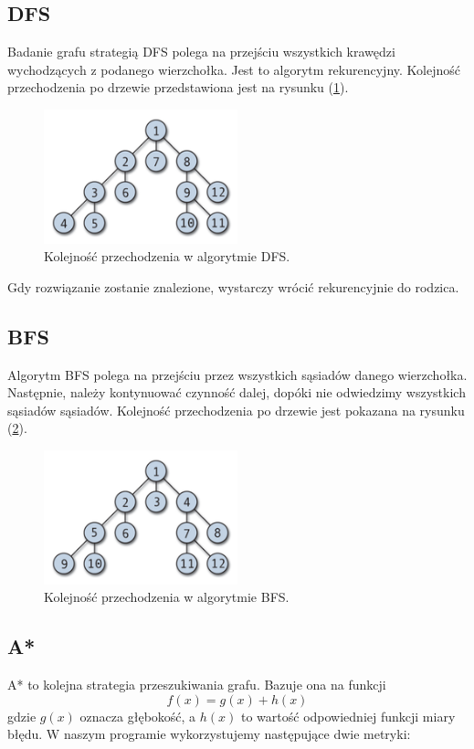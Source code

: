 \documentclass{classrep}
\begin{document}
\subsection{DFS} %
Badanie grafu strategią DFS polega na przejściu wszystkich krawędzi wychodzących z podanego wierzchołka. Jest to algorytm rekurencyjny. Kolejność przechodzenia po drzewie przedstawiona jest na rysunku (\ref{kolejnoscDFS}).
 \begin{figure}[h!]
    \centering
    \includegraphics[width=0.5\textwidth]{dfs.png}
    \caption{Kolejność przechodzenia w algorytmie DFS. \cite{wikiDFS}}
    \label{kolejnoscDFS}
\end{figure}
Gdy rozwiązanie zostanie znalezione, wystarczy wrócić rekurencyjnie do rodzica.

\subsection{BFS} %
Algorytm BFS polega na przejściu przez wszystkich sąsiadów danego wierzchołka. Następnie, należy kontynuować czynność dalej, dopóki nie odwiedzimy wszystkich sąsiadów sąsiadów. Kolejność przechodzenia po drzewie jest pokazana na rysunku (\ref{kolejnoscBFS}).
\begin{figure}[h!]
    \centering
    \includegraphics[width=0.5\textwidth]{bfs.png}
    \caption{Kolejność przechodzenia w algorytmie BFS. \cite{wikiBFS}}
    \label{kolejnoscBFS}
\end{figure}

\subsection{A*} %
A* to kolejna strategia przeszukiwania grafu. Bazuje ona na funkcji 
\begin{equation}
	f(x) = g(x) + h(x) 
	\label{fun}
\end{equation}
gdzie $g(x)$ oznacza głębokość, a $h(x)$ to wartość odpowiedniej funkcji miary błędu. W naszym programie wykorzystujemy następujące dwie metryki:
\end{document}
